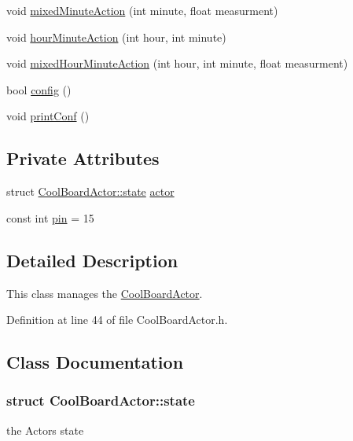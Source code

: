 \begin{DoxyCompactItemize}
void \hyperlink{class_cool_board_actor_a2b8a79a27288d5246e3e3860ae76770d}{mixed\+Minute\+Action} (int minute, float measurment)
\item 
void \hyperlink{class_cool_board_actor_a1eb1fbca19bc80aad20d2686d52317f8}{hour\+Minute\+Action} (int hour, int minute)
\item 
void \hyperlink{class_cool_board_actor_ae6b2a17b0e73cfeb353ded2cc4e08109}{mixed\+Hour\+Minute\+Action} (int hour, int minute, float measurment)
\item 
bool \hyperlink{class_cool_board_actor_a5af5538fc7d169f63127e06d5219bcd4}{config} ()
\item 
void \hyperlink{class_cool_board_actor_aabb10e7aebc3249ffc940530de29f84a}{print\+Conf} ()
\end{DoxyCompactItemize}
\subsection*{Private Attributes}
\begin{DoxyCompactItemize}
\item 
struct \hyperlink{class_cool_board_actor_d5/ddc/struct_cool_board_actor_1_1state}{Cool\+Board\+Actor\+::state} \hyperlink{class_cool_board_actor_a8f190db9f7a39fddbcef7f152da970e9}{actor}
\item 
const int \hyperlink{class_cool_board_actor_a8b5c0b41fe6033b68d9e1ed00bc2e122}{pin} = 15
\end{DoxyCompactItemize}


\subsection{Detailed Description}
This class manages the \hyperlink{class_cool_board_actor}{Cool\+Board\+Actor}. 

Definition at line 44 of file Cool\+Board\+Actor.\+h.



\subsection{Class Documentation}
\label{struct_cool_board_actor_1_1state}
\subsubsection{struct Cool\+Board\+Actor\+:\+:state}
the Actor\textquotesingle{}s state 

